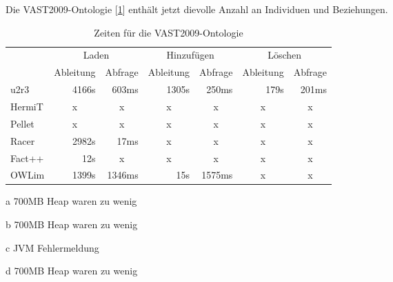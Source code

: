 Die VAST2009-Ontologie [\ref{table-time-vast2009}] enthält jetzt dievolle Anzahl an Individuen und Beziehungen.

\begin{table}[htbp]
\caption{Zeiten für die VAST2009-Ontologie}
\label{table-time-vast2009}
\begin{center}
\begin{threeparttable}
\begin{tabular}{l|r|r|r|r|r|r|}
\cline{2-7}
 & \multicolumn{2}{|c|}{Laden} & \multicolumn{2}{|c|}{Hinzufügen} & \multicolumn{2}{|c|}{Löschen} \\
\cline{2-7}
 & \multicolumn{1}{|c|}{Ableitung} & \multicolumn{1}{|c|}{Abfrage} & \multicolumn{1}{|c|}{Ableitung} & \multicolumn{1}{|c|}{Abfrage} & \multicolumn{1}{|c|}{Ableitung} & \multicolumn{1}{|c|}{Abfrage} \\
\hline
\multicolumn{1}{|l|}{u2r3} & 4166s & 603ms & 1305s & 250ms & 179s & 201ms \\ \hline
\multicolumn{1}{|l|}{HermiT\tnote{a}} & \multicolumn{1}{c|}{x} & \multicolumn{1}{c|}{x} & \multicolumn{1}{c|}{x} & \multicolumn{1}{c|}{x} & \multicolumn{1}{c|}{x} & \multicolumn{1}{c|}{x} \\ \hline
\multicolumn{1}{|l|}{Pellet\tnote{b}} & \multicolumn{1}{c|}{x} & \multicolumn{1}{c|}{x} & \multicolumn{1}{c|}{x} & \multicolumn{1}{c|}{x} & \multicolumn{1}{c|}{x} & \multicolumn{1}{c|}{x} \\ \hline
\multicolumn{1}{|l|}{Racer\tnote{c}} & 2982s & 17ms & \multicolumn{1}{c|}{x} & \multicolumn{1}{c|}{x} & \multicolumn{1}{c|}{x} & \multicolumn{1}{c|}{x} \\ \hline
\multicolumn{1}{|l|}{Fact++\tnote{d}} & 12s & \multicolumn{1}{c|}{x} & \multicolumn{1}{c|}{x} & \multicolumn{1}{c|}{x} & \multicolumn{1}{c|}{x} & \multicolumn{1}{c|}{x} \\ \hline
\multicolumn{1}{|l|}{OWLim} & 1399s & 1346ms & 15s & 1575ms & \multicolumn{1}{c|}{x} & \multicolumn{1}{c|}{x} \\ \hline
\end{tabular}
\begin{tablenotes}
	\item[a] 700MB Heap waren zu wenig
	\item[b] 700MB Heap waren zu wenig
	\item[c] JVM Fehlermeldung
	\item[d] 700MB Heap waren zu wenig
\end{tablenotes}
\end{threeparttable}
\end{center}
\end{table}

